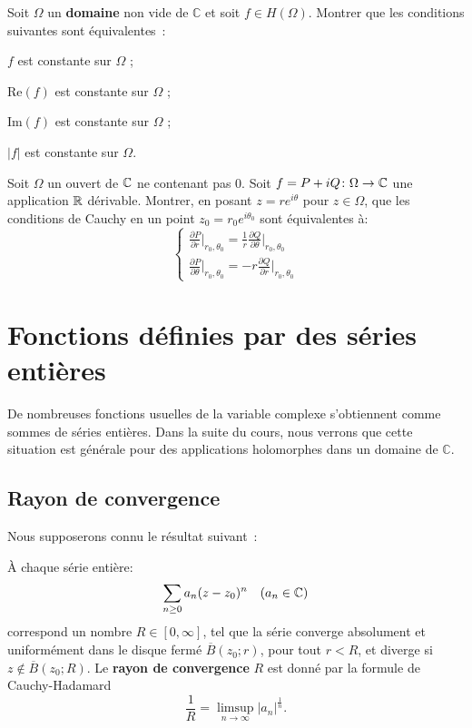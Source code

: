 \begin{exercice}
Soit $\Omega$ un \textbf{domaine} non vide de $\mathbb{C}$ et soit $f \in H(\Omega)$. Montrer que les conditions suivantes sont équivalentes~:
\begin{MYenumerate}
\item $f$ est constante sur $\Omega$ ;
\item $\text{Re}(f)$ est constante sur $\Omega$ ;
\item $\text{Im}(f)$ est constante sur $\Omega$ ;
\item $\lvert f \rvert$ est constante sur $\Omega$.
\end{MYenumerate}
\end{exercice}
\begin{exercice}
Soit $\Omega$ un ouvert de $\mathbb{C}$ ne contenant pas $0.$ Soit $f=P + i Q \colon \Omega \to \mathbb{C}$ une application $\mathbb R$ dérivable. Montrer, en posant $z=re^{i\theta}$ pour $z \in \Omega$, que les conditions de Cauchy en un point $z_0 = r_0 e^{i \theta_0}$ sont équivalentes à:
\[
\begin{cases}
    \frac{\partial P}{\partial r}\vert_{r_0,\theta_0} = \frac{1}{r}\frac{\partial Q}{\partial \theta}\vert_{r_0,\theta_0} \\
    \frac{\partial P}{\partial \theta}\vert_{r_0,\theta_0} =- r\frac{\partial Q}{\partial r}\vert_{r_0,\theta_0}
\end{cases}
\]
\end{exercice}


\section{Fonctions définies par des séries entières}
De nombreuses fonctions usuelles de la variable complexe s'obtiennent comme 
sommes de séries entières. Dans la suite du cours, nous verrons que cette
situation est générale pour des applications holomorphes dans un domaine de
$\mathbb{C}$. 

\subsection{Rayon de convergence}
Nous supposerons connu le résultat suivant~: 

\begin{fprop}\label{prop:ray_cvg}
\`{A} chaque série entière:
\[\sum_{n \geq 0} a_n (z-z_0)^n \quad (a_n \in \mathbb{C})\]
correspond un nombre $R \in [0, \infty]$, tel que la série converge absolument et uniformément dans le disque fermé $\overline{B}(z_0 ; r)$, pour tout $r<R$, et diverge si $z \notin \overline{B}(z_0 ; R)$. Le \textbf{rayon de convergence} $R$ est donné par la formule de Cauchy-Hadamard 
\[\frac{1}{R}=\limsup_{n \to \infty} \lvert a_n\rvert^{\frac{1}{n}}.\]
\end{fprop}

